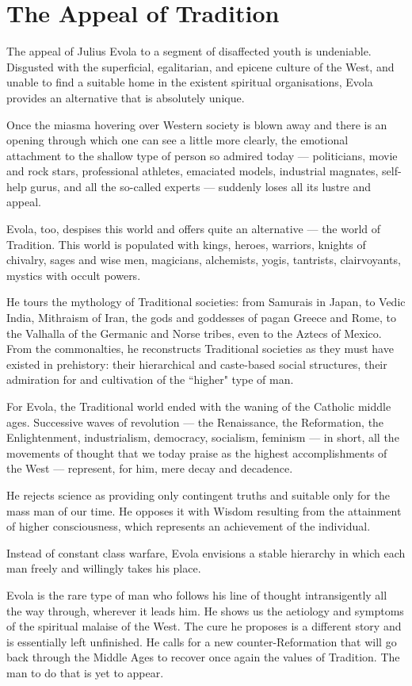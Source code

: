 \section{The Appeal of Tradition}

The appeal of Julius Evola to a segment of disaffected youth is undeniable. Disgusted with the superficial, egalitarian, and epicene culture of the West, and unable to find a suitable home in the existent spiritual organisations, Evola provides an alternative that is absolutely unique.

Once the miasma hovering over Western society is blown away and there is an opening through which one can see a little more clearly, the emotional attachment to the shallow type of person so admired today — politicians, movie and rock stars, professional athletes, emaciated models, industrial magnates, self-help gurus, and all the so-called experts — suddenly loses all its lustre and appeal.

Evola, too, despises this world and offers quite an alternative — the world of Tradition. This world is populated with kings, heroes, warriors, knights of chivalry, sages and wise men, magicians, alchemists, yogis, tantrists, clairvoyants, mystics with occult powers.

He tours the mythology of Traditional societies: from Samurais in Japan, to Vedic India, Mithraism of Iran, the gods and goddesses of pagan Greece and Rome, to the Valhalla of the Germanic and Norse tribes, even to the Aztecs of Mexico. From the commonalties, he reconstructs Traditional societies as they must have existed in prehistory: their hierarchical and caste-based social structures, their admiration for and cultivation of the ``higher" type of man.

For Evola, the Traditional world ended with the waning of the Catholic middle ages. Successive waves of revolution — the Renaissance, the Reformation, the Enlightenment, industrialism, democracy, socialism, feminism — in short, all the movements of thought that we today praise as the highest accomplishments of the West — represent, for him, mere decay and decadence.

He rejects science as providing only contingent truths and suitable only for the mass man of our time. He opposes it with Wisdom resulting from the attainment of higher consciousness, which represents an achievement of the individual.

Instead of constant class warfare, Evola envisions a stable hierarchy in which each man freely and willingly takes his place.

Evola is the rare type of man who follows his line of thought intransigently all the way through, wherever it leads him. He shows us the aetiology and symptoms of the spiritual malaise of the West. The cure he proposes is a different story and is essentially left unfinished. He calls for a new counter-Reformation that will go back through the Middle Ages to recover once again the values of Tradition. The man to do that is yet to appear.



